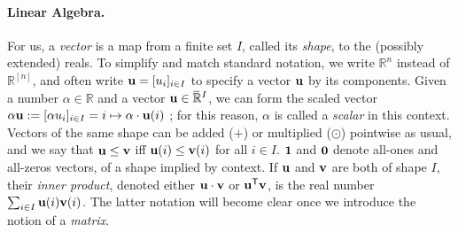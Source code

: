 
\paragraph{Linear Algebra.}
For us, a \emph{vector} is a map from a finite set $I$, called its 
\emph{shape}, to the (possibly extended) reals.
To simplify and match standard notation, we write $\mathbb R^n$ instead of $\mathbb R^{[n]}$, and often write $\mathbf u = [u_i]_{i \in I}$ to specify a vector $\mathbf u$ by its components.
Given a number $\alpha \in \mathbb R$ and a vector $\mathbf u \in \mskip1mu\overline{\mskip-1mu\mathbb R\!}\,^I$,
    we can form the scaled vector 
    $\alpha \mathbf u := [ \alpha  u_i ]_{i \in I} = i \mapsto \mathbf \alpha \cdot \mathbf u(i)$
    \unskip;
    for this reason, $\alpha$ is called a \emph{scalar} in this context. 
Vectors of the same shape
can be added ($+$) or multiplied ($\odot$) pointwise as usual,
    and we say that $\mathbf u \le \mathbf v$ iff $\mathbf u(i) \le \mathbf v(i)$ for all $i \in I$.
$\mathbf 1$ and $\mathbf 0$ denote all-ones and all-zeros vectors, of a shape implied by context.
If $\mathbf u$ and $\mathbf v$ are both of shape $I$, their \emph{inner product}, denoted either $\mathbf u \cdot \mathbf v$ or $\mathbf u ^{\sf T} \mathbf v$,
    is the real number $\sum_{i \in I} \mathbf u(i) \mathbf v(i)$. 
The latter notation will become clear once we introduce the notion of a \emph{matrix}. 

